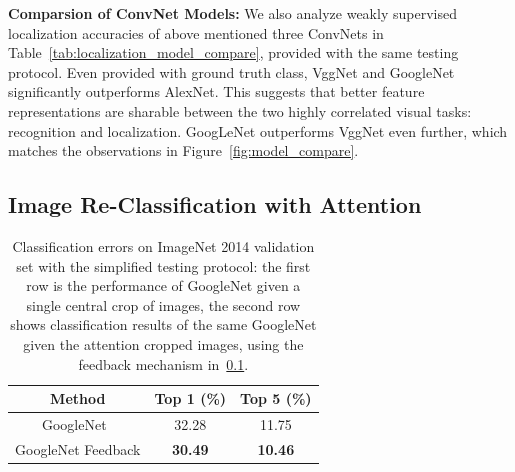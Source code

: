 \textbf{Comparsion of ConvNet Models:} We also analyze weakly supervised localization accuracies of above mentioned three ConvNets in Table~\ref{tab:localization_model_compare}, provided with the same testing protocol. Even provided with ground truth class, VggNet and GoogleNet significantly outperforms AlexNet.
This suggests that better feature representations are sharable between the two highly correlated visual tasks: recognition and localization. GoogLeNet outperforms VggNet even further, which matches the observations in Figure~\ref{fig:model_compare}.

\subsection{Image Re-Classification with Attention}
\label{subsec:re-classification}

\begin{table}
\centering
\small
\begin{tabular}{|c|c|c|}
\hline
Method & Top 1 (\%) & Top 5 (\%) \\ \hline
GoogleNet~\cite{Szegedy2014Going} & 32.28 & 11.75 \\ \hline
GoogleNet Feedback & \textbf{30.49} & \textbf{10.46} \\ \hline
\end{tabular}
\caption{Classification errors on ImageNet 2014 validation set with the simplified testing protocol: the first row is the performance of  GoogleNet given a single central crop of images, the second row shows classification results of the same GoogleNet given the attention cropped images, using the feedback mechanism in~\ref{subsec:re-classification}.}
\label{tab:reclassification_error}
\end{table}

